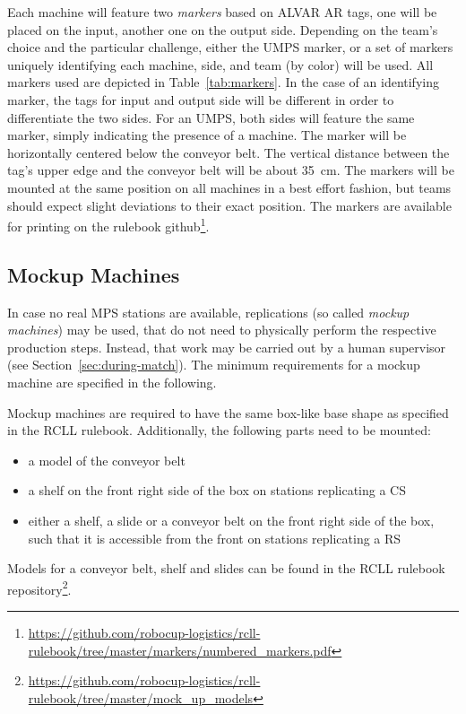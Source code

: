 \documentclass[12pt,twoside]{article}
\newcommand{\refsec}[1]{Section~\ref{#1}}
\newcommand{\reftab}[1]{Table~\ref{#1}}
\begin{document}
Each machine will feature two \emph{markers} based on ALVAR AR tags,
one will be placed on the input, another one on the output side.
Depending on the
team's choice and the particular challenge, either the \ac{UMPS} marker,
or a set of markers uniquely identifying each machine, side,
and team (by color) will be used.
All markers used are depicted in \reftab{tab:markers}.
In the case of an identifying marker, the tags for input and output side will
be different in order to differentiate the two sides.
For an \ac{UMPS}, both sides will feature the same marker, simply
indicating the presence of a machine. The marker will be
horizontally centered below the conveyor belt. The vertical distance
between the tag's upper edge and the conveyor belt will be about
\SI{35}{\centi\metre}. The markers will be mounted at the same
position on all machines in a best effort fashion, but teams should expect
slight deviations to their exact position.
The markers are available for printing on the rulebook github\footnote{
  \url{https://github.com/robocup-logistics/rcll-rulebook/tree/master/markers/numbered_markers.pdf} %
}.

\subsection{Mockup Machines}
\label{sec:mockup-machines}
In case no real \ac{MPS} stations are available, replications
(so called \emph{mockup machines}) may be used, that do not need to
physically perform the respective production steps. Instead, that work may
be carried out by a human supervisor (see \refsec{sec:during-match}).
The minimum requirements for a mockup machine are specified in the following.

Mockup machines are required to have the same box-like base shape as specified
in the \ac{RCLL} rulebook.
Additionally, the following parts need to be mounted:
\begin{itemize}
	\item a model of the conveyor belt
	\item a shelf on the front right side of the box on stations replicating a
		CS
	\item either a shelf, a slide or a conveyor belt on the front right side
of the box, such that it is accessible from the front on stations replicating a
		\ac{RS}
\end{itemize}
Models for a conveyor belt, shelf and slides can be found in the
\ac{RCLL} rulebook repository\footnote{\url{https://github.com/robocup-logistics/rcll-rulebook/tree/master/mock_up_models}}. %
\end{document}
